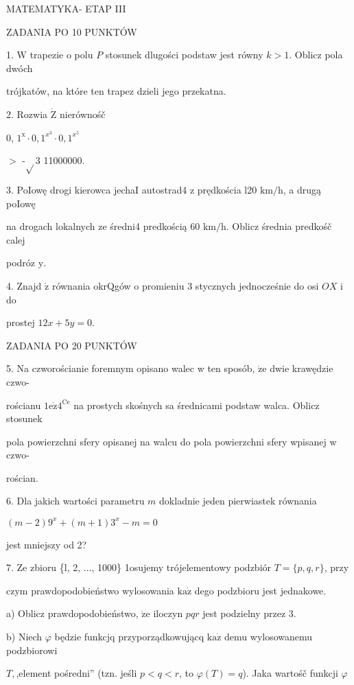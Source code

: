 \documentclass[a4paper,12pt]{article}
\begin{document}
MATEMATYKA- ETAP III

ZADANIA PO 10 PUNKTÓW

1. $\mathrm{W}$ trapezie o polu $P$ stosunek dlugości podstaw jest równy $k>1$. Oblicz pola dwóch

trójkatów, na które ten trapez dzieli jego przekatna.

2. Rozwia $\dot{\mathrm{Z}}$ nierównośč

0, $1^{\mathrm{x}}\cdot 0, 1^{x^{3}}\cdot 0, 1^{x^{5}}$

$>$ -$\sqrt{}$3 11000000.

3. PoIowę drogi kierowca jechaI autostrad4 z prędkościa l20 $\mathrm{k}\mathrm{m}/\mathrm{h}$, a drugą poIowę

na drogach lokalnych ze średni4 predkością 60 $\mathrm{k}\mathrm{m}/\mathrm{h}$. Oblicz średnia predkośč calej

podróz $\mathrm{y}.$

4. Znajd $\acute{\mathrm{z}}$ równania okrQgów o promieniu 3 stycznych jednocześnie do osi $OX$ i do

prostej $12x+5y=0.$

ZADANIA PO 20 PUNKTÓW

5. Na czworościanie foremnym opisano walec w ten sposób, $\dot{\mathrm{z}}\mathrm{e}$ dwie krawędzie czwo-

rościanu $1\mathrm{e}\dot{\mathrm{z}}4^{\mathrm{C}\mathrm{e}}$ na prostych skośnych sa średnicami podstaw walca. Oblicz stosunek

pola powierzchni sfery opisanej na walcu do pola powierzchni sfery wpisanej w czwo-

rościan.

6. Dla jakich wartości parametru $m$ dokladnie jeden pierwiastek równania

$(m-2)9^{x}+(m+1)3^{x}-m=0$

jest mniejszy od 2?

7. Ze zbioru \{l, 2, $\ldots$, 1000\} 1osujemy trójelementowy podzbiór $T = \{p,q,r\}$, przy

czym prawdopodobieństwo wylosowania $\mathrm{k}\mathrm{a}\dot{\mathrm{z}}$ dego podzbioru jest jednakowe.

a) Oblicz prawdopodobieństwo, $\dot{\mathrm{z}}\mathrm{e}$ iloczyn $pqr$ jest podzielny przez 3.

b) Niech $\varphi$ będzie funkcjq przyporządkowującq $\mathrm{k}\mathrm{a}\dot{\mathrm{z}}$ demu wylosowanemu podzbiorowi

$T,$,element pośredni'' (tzn. jeśli $p<q<r$, to $\varphi(T)=q$). Jaka wartośč funkcji $\varphi$
\end{document}
